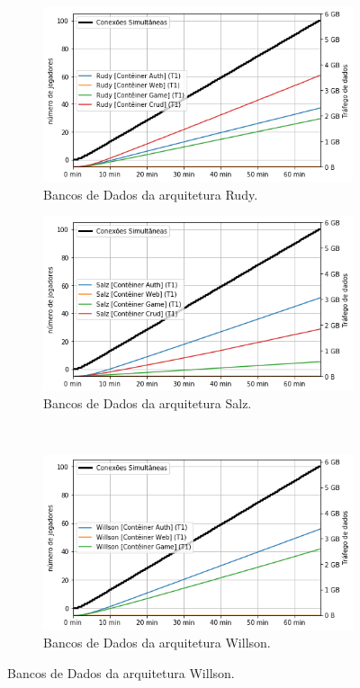 \begin{figure}[htb!]
    \caption{Saída de dados da rede dos microsserviços.}
    \label{fig:experimento_game_net_out}

    \begin{subfigure}{0.5\textwidth}
        \centering
        \includegraphics[width=.95\linewidth]{figuras/analise/rt/r_net_out_arch.png}
        \caption{Bancos de Dados da arquitetura Rudy.}
        \label{fig:r_netout_arch}
    \end{subfigure}%
    \begin{subfigure}{0.5\textwidth}
        \centering
        \includegraphics[width=.95\linewidth]{figuras/analise/rt/s_net_out_arch.png}
        \caption{Bancos de Dados da arquitetura Salz.}
        \label{fig:s_netout_arch}
    \end{subfigure}\\

    \begin{subfigure}{0.5\textwidth}
        \centering
        \includegraphics[width=.95\linewidth]{figuras/analise/rt/w_net_out_arch.png}
        \caption{Bancos de Dados da arquitetura Willson.}
        \label{fig:w_netout_arch}
    \end{subfigure}


\end{figure}
